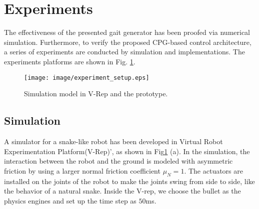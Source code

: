\documentclass[letterpaper, 10 pt, conference]{ieeeconf}
\begin{document}

\section{Experiments}
The effectiveness of the presented gait generator has been proofed via numerical simulation. Furthermore, to verify the proposed CPG-based control architecture, a series of experiments are conducted by simulation and implementations. The experiments platforms are shown in Fig. \ref{experiment_setup}.

\begin{figure}[thpb]
    \centering
    \texttt{[image: image/experiment\_setup.eps]}
    \caption{Simulation model in V-Rep and the prototype.}
    \label{experiment_setup}
\end{figure}

\subsection{Simulation}

A simulator for a snake-like robot has been developed in Virtual Robot Experimentation Platform(V-Rep)', as shown in Fig\ref{experiment_setup} (a). In the simulation, the interaction between the robot and the ground is modeled with asymmetric friction by using a larger normal friction coefficient $\mu_N=1$. The actuators are installed on the joints of the robot to make the joints swing from side to side, like the behavior of a natural snake. Inside the V-rep, we choose the bullet as the physics engines and set up the time step as $50$ms.
\end{document}
